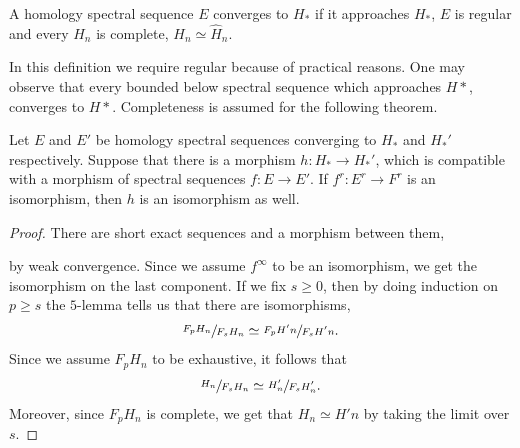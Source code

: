 \documentclass[../thesis.tex]{subfiles}
\begin{document}
        \begin{definition}[Convergence]
            A homology spectral sequence $E$ converges to $H_*$ if it approaches $H_*$, $E$ is regular and every $H_n$ is complete, $H_n \simeq \widehat{H}_n$.
        \end{definition}

        In this definition we require regular because of practical reasons. One may observe that every bounded below spectral sequence which approaches $H*$, converges to $H*$. Completeness is assumed for the following theorem. 

        \begin{thm}\label{thm: comp-thm}
            Let $E$ and $E'$ be homology spectral sequences converging to $H_*$ and $H_*'$ respectively. Suppose that there is a morphism $h : H_* \rightarrow H_*'$, which is compatible with a morphism of spectral sequences $f : E \rightarrow E'$. If $f^r : E^r \rightarrow F^r$ is an isomorphism, then $h$ is an isomorphism as well.
        \end{thm}

        \begin{proof}
            There are short exact sequences and a morphism between them,
            \begin{center}
            \end{center}
            by weak convergence. Since we assume $f^\infty$ to be an isomorphism, we get the isomorphism on the last component. If we fix $s \geq 0$, then by doing induction on $p \geq s$ the $5$-lemma tells us that there are isomorphisms,
            \begin{align*}
                \sfrac{F_p H_n}{F_s H_n} \simeq \sfrac{F_p H'n}{F_s H'n}\text{.}
            \end{align*}
            Since we assume $F_pH_n$ to be exhaustive, it follows that
            \begin{align*}
                \sfrac{H_n}{F_sH_n} \simeq \sfrac{H'_n}{F_s H'_n}\text{.}
            \end{align*}
            Moreover, since $F_pH_n$ is complete, we get that $H_n \simeq H'n$ by taking the limit over $s$.
        \end{proof}
\end{document}
